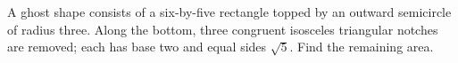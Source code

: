A ghost shape consists of a six-by-five rectangle topped by an outward semicircle of radius three. Along the bottom, three congruent isosceles triangular notches are removed; each has base two and equal sides $\sqrt5$. Find the remaining area.
